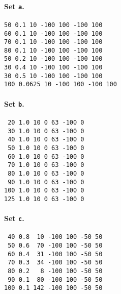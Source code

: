 \documentclass[a4paper, 12pt]{article}
\begin{document}
\begin{minipage}[t]{4cm}
\paragraph{Set {\tt a}.}
\begin{tiny}
\begin{verbatim}
50 0.1 10 -100 100 -100 100
60 0.1 10 -100 100 -100 100
70 0.1 10 -100 100 -100 100
80 0.1 10 -100 100 -100 100
50 0.2 10 -100 100 -100 100
30 0.4 10 -100 100 -100 100
30 0.5 10 -100 100 -100 100
100 0.0625 10 -100 100 -100 100
\end{verbatim}
\end{tiny}
\end{minipage}
\hfill
\begin{minipage}[t]{4cm}
\paragraph{Set {\tt b}.}
\begin{tiny}
\begin{verbatim}
 20 1.0 10 0 63 -100 0
 30 1.0 10 0 63 -100 0
 40 1.0 10 0 63 -100 0
 50 1.0 10 0 63 -100 0
 60 1.0 10 0 63 -100 0
 70 1.0 10 0 63 -100 0
 80 1.0 10 0 63 -100 0
 90 1.0 10 0 63 -100 0
100 1.0 10 0 63 -100 0
125 1.0 10 0 63 -100 0
\end{verbatim}
\end{tiny}
\end{minipage}
\hfill
\begin{minipage}[t]{4cm}
\paragraph{Set {\tt c}.}
\begin{tiny}
\begin{verbatim}
 40 0.8  10 -100 100 -50 50
 50 0.6  70 -100 100 -50 50
 60 0.4  31 -100 100 -50 50
 70 0.3  34 -100 100 -50 50
 80 0.2   8 -100 100 -50 50
 90 0.1  80 -100 100 -50 50
100 0.1 142 -100 100 -50 50
\end{verbatim}
\end{tiny}
\end{minipage}
\end{document}
